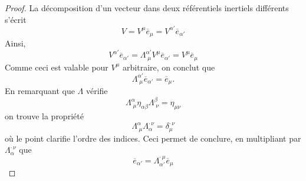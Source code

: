 \begin{proof}
La décomposition d'un vecteur dans deux référentiels inertiels différents s'écrit
    \begin{equation}
    V = V^{\mu} \overline{e}_{\mu} = V^{\alpha '} \overline{e}_{\alpha '}
\end{equation}
Ainsi,
\begin{equation}
    V^{\alpha '} \overline{e}_{\alpha '} = \Lambda^{\alpha'}_{\; \mu} V^\mu \overline{e}_{\alpha '} = V^\mu \overline{e}_{\mu}
\end{equation}
Comme ceci est valable pour $V^\mu$ arbitraire, on conclut que 
\begin{equation}
    \Lambda^{\alpha'}_{\; \mu} \overline{e}_{\alpha '} = \overline{e}_{\mu}.
\end{equation}
En remarquant que $\Lambda$ vérifie
\begin{equation}
    \Lambda^\alpha_{\;\mu} \eta_{\alpha\beta} \Lambda^\beta_{\;\nu} = \eta_{\mu\nu}
\end{equation}
on trouve la propriété
\begin{equation}
    \label{eq:id lambda}
    \Lambda^\alpha_{\;\mu} \Lambda^{\cdot\,\nu}_\alpha = \delta^{\cdot\, \nu}_\mu
\end{equation}
où le point clarifie l'ordre des indices. Ceci permet de conclure, en multipliant par $\Lambda^{\cdot\,\nu}_\alpha$ que
\begin{equation}
    \overline{e}_{\alpha '} = \Lambda^{\cdot\,\mu}_{\alpha'}\overline{e}_{\mu}
\end{equation}
\end{proof}

